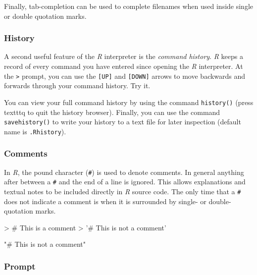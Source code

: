 \documentclass[10pt,letterpaper]{article}
\begin{document}
Finally, tab-completion can be used to complete filenames when used inside single or double quotation marks.


\subsubsection{History} %
\label{ssub:history}

A second useful feature of the \emph{R} interpreter is the \emph{command history}.  \emph{R} keeps a record of every command you have entered since opening the \emph{R} interpreter.  At the \texttt{>} prompt, you can use the \texttt{[UP]} and \texttt{[DOWN]} arrows to move backwards and forwards through your command history.  Try it.

You can view your full command history by using the command \texttt{history()} (press texttt{q} to quit the history browser).  Finally, you can use the command \texttt{savehistory()} to write your history to a text file for later inspection (default name is \texttt{.Rhistory}).


\subsubsection{Comments} %
\label{ssub:comments}

In \emph{R}, the pound character (\texttt{\#}) is used to denote comments.  In general anything after between a \texttt{\#} and the end of a line is ignored.  This allows explanations and textual notes to be included directly in \emph{R} source code.  The only time that a \texttt{\#} does not indicate a comment is when it is surrounded by single- or double- quotation marks.

\begin{Schunk}
\begin{Sinput}
> # This is a comment
> '# This is not a comment'
\end{Sinput}
\begin{Soutput}
[1] "# This is not a comment"
\end{Soutput}
\end{Schunk}


\subsubsection{Prompt} %
\label{ssub:prompt}
\end{document}
